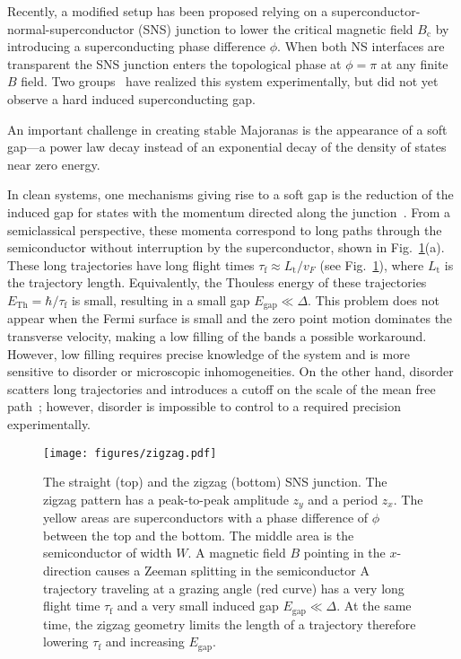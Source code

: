 \documentclass[english, twocolumn, 10pt, aps, superscriptaddress, floatfix, prb, citeautoscript]{revtex4-1}
\renewcommand{\comment}[2]{#2}
\begin{document}
\comment{SNS junctions also work and require smaller field.}
Recently, a modified setup has been proposed\cite{Pientka2017,Hell2017} relying on a superconductor-normal-superconductor (SNS) junction to lower the critical magnetic field $B_\textrm{c}$ by introducing a superconducting phase difference $\phi$.
When both NS interfaces are transparent the SNS junction enters the topological phase at $\phi=\pi$ at any finite $B$ field.
Two groups~\cite{Fornieri2018,Ren2018} have realized this system experimentally, but did not yet observe a hard induced superconducting gap.

\comment{The gap is small because of long trajectories.}
An important challenge in creating stable Majoranas is the appearance of a soft gap---a power law decay instead of an exponential decay of the density of states near zero energy.

In clean systems, one mechanisms giving rise to a soft gap is the reduction of the
induced gap for states with the momentum directed along the
junction~\cite{Gennes1963,Beenakker2005}.
From a semiclassical perspective, these momenta correspond to long paths through the semiconductor without interruption by the superconductor, shown in Fig.~\ref{fig:setup}(a).
These long trajectories have long flight times $\tau_\textrm{f} \approx L_\textrm{t} / v_F$ (see Fig.~\ref{fig:setup}), where $L_\textrm{t}$ is the trajectory length.
Equivalently, the Thouless energy of these trajectories $E_{\textrm{Th}}=\hbar / \tau_\textrm{f}$ is small, resulting in a small gap $E_\textrm{gap} \ll \Delta$.
This problem does not appear when the Fermi surface is small and the zero point motion dominates the transverse velocity, making a low filling of the bands a possible workaround\cite{Beenakker2005, Nijholt2015}.
However, low filling requires precise knowledge of the system and is more sensitive to disorder or microscopic inhomogeneities.
On the other hand, disorder scatters long trajectories and introduces a cutoff on the scale of the mean free path~\cite{Haim2018}; however, disorder is impossible to control to a required precision experimentally.

\begin{figure}[!htb]
\centering
\texttt{[image: figures/zigzag.pdf]}
\caption{The straight (top) and the zigzag (bottom) SNS junction.
The zigzag pattern has a peak-to-peak amplitude $z_y$ and a period $z_x$.
The yellow areas are superconductors with a phase difference of $\phi$ between the top and the bottom.
The middle area is the semiconductor of width $W$.
A magnetic field $B$ pointing in the $x$-direction causes a Zeeman splitting in the semiconductor
A trajectory traveling at a grazing angle (red curve) has a very long flight time $\tau_\textrm{f}$ and a very small induced gap $E_\textrm{gap} \ll \Delta$.
At the same time, the zigzag geometry limits the length of a trajectory therefore lowering $\tau_\textrm{f}$ and increasing $E_\textrm{gap}$.
\label{fig:setup}}
\end{figure}
\end{document}
